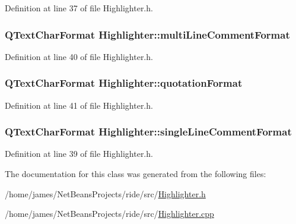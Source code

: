 Definition at line 37 of file Highlighter.\-h.

\hypertarget{class_highlighter_ad4661760f22cf913b696ec90dea994c0}{
\subsubsection[{multi\-Line\-Comment\-Format}]{\setlength{\rightskip}{0pt plus 5cm}Q\-Text\-Char\-Format Highlighter\-::multi\-Line\-Comment\-Format\hspace{0.3cm}{\ttfamily [private]}}}\label{class_highlighter_ad4661760f22cf913b696ec90dea994c0}


Definition at line 40 of file Highlighter.\-h.

\hypertarget{class_highlighter_a3d4bf96c8ea27ba18bca4adc6b306db8}{
\subsubsection[{quotation\-Format}]{\setlength{\rightskip}{0pt plus 5cm}Q\-Text\-Char\-Format Highlighter\-::quotation\-Format\hspace{0.3cm}{\ttfamily [private]}}}\label{class_highlighter_a3d4bf96c8ea27ba18bca4adc6b306db8}


Definition at line 41 of file Highlighter.\-h.

\hypertarget{class_highlighter_ad1ca0f6942b0451781d7e32f1781f22b}{
\subsubsection[{single\-Line\-Comment\-Format}]{\setlength{\rightskip}{0pt plus 5cm}Q\-Text\-Char\-Format Highlighter\-::single\-Line\-Comment\-Format\hspace{0.3cm}{\ttfamily [private]}}}\label{class_highlighter_ad1ca0f6942b0451781d7e32f1781f22b}


Definition at line 39 of file Highlighter.\-h.



The documentation for this class was generated from the following files\-:\begin{DoxyCompactItemize}
\item 
/home/james/\-Net\-Beans\-Projects/ride/src/\hyperlink{_highlighter_8h}{Highlighter.\-h}\item 
/home/james/\-Net\-Beans\-Projects/ride/src/\hyperlink{_highlighter_8cpp}{Highlighter.\-cpp}\end{DoxyCompactItemize}
